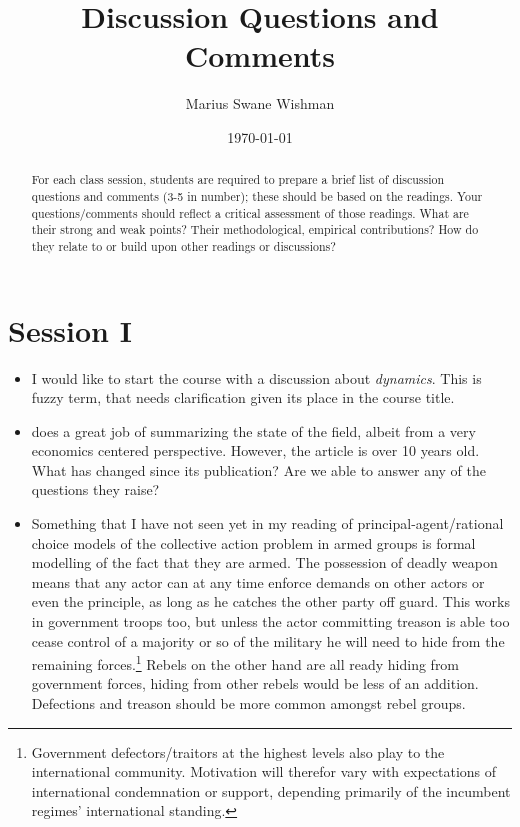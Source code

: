 \documentclass[12pt]{article}
\title{Discussion Questions and Comments}
\author[1]{Marius Swane Wishman}
\affil[1]{Department of Sociology and Political Science, NTNU}
\date{\today}
\providecommand{\keywords}[1]
{
	\small	
	\textbf{\textit{Keywords---}} #1
}
\begin{document}
\maketitle

\begin{abstract}
	For each class session, students are required to prepare a brief list of
	discussion questions and comments (3-5 in number); these should be based
	on the readings. Your questions/comments should reflect a critical
	assessment of those readings. What are their strong and weak points?
	Their methodological, empirical contributions? How do they relate to or
	build upon other readings or discussions?
\end{abstract}


\pagebreak


\onehalfspacing

\section*{Session I}

\begin{itemize}
	\item I would like to start the course with a discussion about
		\textit{dynamics}. This is fuzzy term, that needs clarification
		given its place in the course title.

	\item \citet{Blattman2010} does a great job of summarizing the state of
		the field, albeit from a very economics centered perspective.
		However, the article is over 10 years old. What has changed
		since its publication? Are we able to answer any of the
		questions they raise?

	\item Something that I have not seen yet in my reading of
		principal-agent/rational choice models of the collective action
		problem in armed groups is formal modelling of the fact that
		they are armed. The possession of deadly weapon means that any
		actor can at any time enforce demands on other actors or even
		the principle, as long as he catches the other party off guard.
		This  works in government troops too, but unless the actor
		committing treason is able too cease control of a majority or so
		of the military he will need to hide from the remaining
		forces.\footnote{Government defectors/traitors at the highest
			levels also play to the international community.
			Motivation will therefor vary with expectations of
			international condemnation or support, depending
		primarily of the incumbent regimes' international standing.}
		Rebels on the other hand are all ready hiding from government
		forces, hiding from other rebels would be less of an addition.
		Defections and treason should be more common amongst rebel
		groups.
	
\end{itemize}
\end{document}
